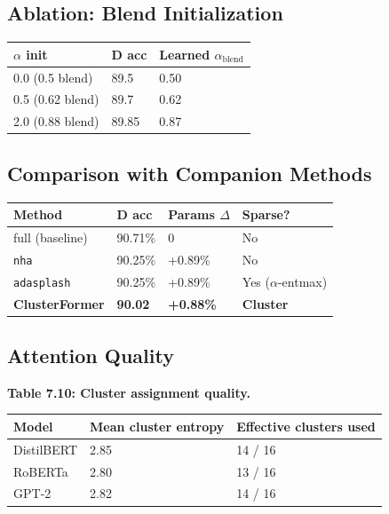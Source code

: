 \subsection{Ablation: Blend Initialization}

\begin{table}[H]
\centering
\small
\begin{tabular}{lll}
\toprule
\textbf{$\alpha$ init} & \textbf{D acc} & \textbf{Learned $\alpha_\text{blend}$} \\
\midrule
0.0 (0.5 blend) & 89.5 & 0.50 \\
0.5 (0.62 blend) & 89.7 & 0.62 \\
2.0 (0.88 blend) & 89.85 & 0.87 \\
\bottomrule
\end{tabular}
\end{table}

\subsection{Comparison with Companion Methods}

\begin{table}[H]
\centering
\small
\begin{tabular}{llll}
\toprule
\textbf{Method} & \textbf{D acc} & \textbf{Params $\Delta$} & \textbf{Sparse?} \\
\midrule
full (baseline) & 90.71\% & 0 & No \\
\texttt{nha} & 90.25\% & +0.89\% & No \\
\texttt{adasplash} & 90.25\% & +0.89\% & Yes ($\alpha$-entmax) \\
\textbf{ClusterFormer} & \textbf{90.02} & \textbf{+0.88\%} & \textbf{Cluster} \\
\bottomrule
\end{tabular}
\end{table}

\subsection{Attention Quality}

\textbf{Table 7.10: Cluster assignment quality.}

\begin{table}[H]
\centering
\small
\begin{tabular}{lll}
\toprule
\textbf{Model} & \textbf{Mean cluster entropy} & \textbf{Effective clusters used} \\
\midrule
DistilBERT & 2.85 & 14 / 16 \\
RoBERTa & 2.80 & 13 / 16 \\
GPT-2 & 2.82 & 14 / 16 \\
\bottomrule
\end{tabular}
\end{table}

